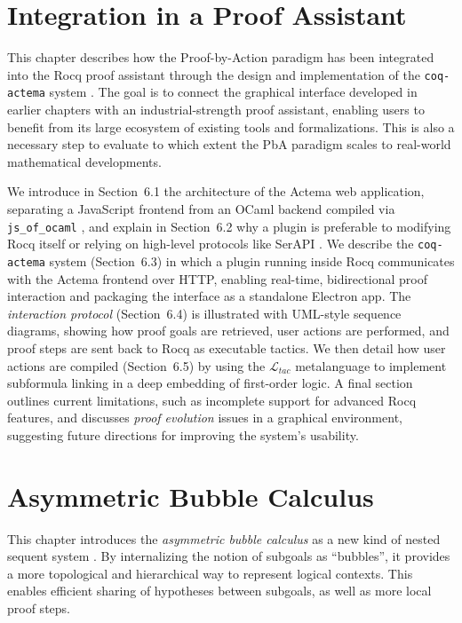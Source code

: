 \documentclass[11pt]{article}
\begin{document}
\section{Integration in a Proof Assistant}

This chapter describes how the Proof-by-Action paradigm has been integrated into the Rocq proof assistant through the design and implementation of the \texttt{coq-actema} system \cite{coq-actema}. The goal is to connect the graphical interface developed in earlier chapters with an industrial-strength proof assistant, enabling users to benefit from its large ecosystem of existing tools and formalizations. This is also a necessary step to evaluate to which extent the PbA paradigm scales to real-world mathematical developments.

We introduce in Section~6.1 the architecture of the Actema web application, separating a JavaScript frontend from an OCaml backend compiled via \texttt{js\_of\_ocaml} \cite{vouillon_bytecode_2014}, and explain in Section~6.2 why a plugin is preferable to modifying Rocq itself or relying on high-level protocols like SerAPI \cite{gallegoarias:hal_01384408}. We describe the \texttt{coq-actema} system (Section~6.3) in which a plugin running inside Rocq communicates with the Actema frontend over HTTP, enabling real-time, bidirectional proof interaction and packaging the interface as a standalone Electron app. The \emph{interaction protocol} (Section~6.4) is illustrated with UML-style sequence diagrams, showing how proof goals are retrieved, user actions are performed, and proof steps are sent back to Rocq as executable tactics. We then detail how user actions are compiled (Section~6.5) by using the $\mathcal{L}_{tac}$ metalanguage to implement subformula linking in a deep embedding of first-order logic. A final section outlines current limitations, such as incomplete support for advanced Rocq features, and discusses \emph{proof evolution} issues in a graphical environment, suggesting future directions for improving the system's usability.

\section{Asymmetric Bubble Calculus}

This chapter introduces the \emph{asymmetric bubble calculus} as a new kind of nested sequent system \cite{brunnler_deep_2009}. By internalizing the notion of subgoals as ``bubbles'', it provides a more topological and hierarchical way to represent logical contexts. This enables efficient sharing of hypotheses between subgoals, as well as more local proof steps.
\end{document}
